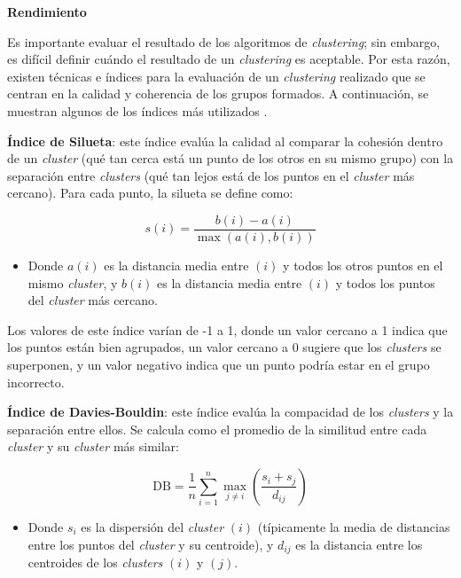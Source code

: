 \textbf{Rendimiento}

Es importante evaluar el resultado de los algoritmos de \textit{clustering}; sin embargo, es difícil definir cuándo el resultado de un \textit{clustering} es aceptable. Por esta razón, existen técnicas e índices para la evaluación de un \textit{clustering} realizado que se centran en la calidad y coherencia de los grupos formados. A continuación, se muestran algunos de los índices más utilizados \cite{halkidi2001clustering}.

\textbf{Índice de Silueta}: este índice evalúa la calidad al comparar la cohesión dentro de un \textit{cluster} (qué tan cerca está un punto de los otros en su mismo grupo) con la separación entre \textit{clusters} (qué tan lejos está de los puntos en el \textit{cluster} más cercano). Para cada punto, la silueta se define como:

\begin{equation}
    s(i) = \frac{b(i) - a(i)}{\max(a(i), b(i))} 
\end{equation}
\begin{itemize}
\item Donde $a(i)$  es la distancia media entre $(i)$ y todos los otros puntos en el mismo \textit{cluster}, y $b(i)$ es la distancia media entre $(i)$ y todos los puntos del \textit{cluster} más cercano.
\end{itemize}

Los valores de este índice varían de -1 a 1, donde un valor cercano a 1 indica que los puntos están bien agrupados, un valor cercano a 0 sugiere que los \textit{clusters} se superponen, y un valor negativo indica que un punto podría estar en el grupo incorrecto.

\textbf{Índice de Davies-Bouldin}: este índice evalúa la compacidad de los \textit{clusters} y la separación entre ellos. Se calcula como el promedio de la similitud entre cada \textit{cluster} y su \textit{cluster} más similar:

\begin{equation}
    \text{DB} = \frac{1}{n} \sum_{i=1}^{n} \max_{j \neq i} \left( \frac{s_i + s_j}{d_{ij}} \right) 
\end{equation}
\begin{itemize}
\item Donde $s_i$ es la dispersión del \textit{cluster} $(i)$ (típicamente la media de distancias entre los puntos del \textit{cluster} y su centroide), y $d_{ij}$ es la distancia entre los centroides de los \textit{clusters} $(i)$ y $(j)$.
\end{itemize}

